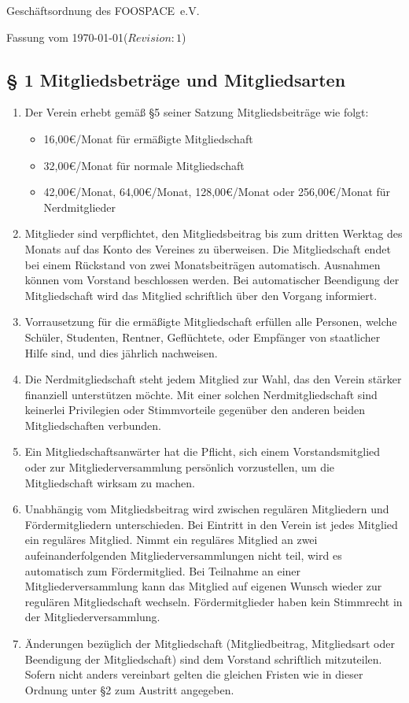 \documentclass[10pt,a4paper]{article}
\newcommand{\name}{FOOSPACE}
\newcommand{\revision}{$Revision: 1$}
\begin{document}
{\LARGE Geschäftsordnung des \name\ e.V.}

Fassung vom \today (\revision)
%
%
\subsection*{§ 1 Mitgliedsbeträge und Mitgliedsarten}
\begin{enumerate}
\item Der Verein erhebt gemäß §5 seiner Satzung Mitgliedsbeiträge wie folgt:
    \begin{itemize}
    \item 16,00€/Monat für ermäßigte Mitgliedschaft
    \item 32,00€/Monat für normale Mitgliedschaft
    \item 42,00€/Monat, 64,00€/Monat, 128,00€/Monat oder 256,00€/Monat für Nerdmitglieder
    \end{itemize}
    

    \item Mitglieder sind verpflichtet, den Mitgliedsbeitrag bis zum dritten Werktag des Monats
    auf das Konto des Vereines zu überweisen. Die Mitgliedschaft endet bei einem Rückstand
    von zwei Monatsbeiträgen automatisch. Ausnahmen können vom Vorstand beschlossen werden.
    Bei automatischer Beendigung der Mitgliedschaft wird das Mitglied schriftlich über den
    Vorgang informiert.

    \item Vorrausetzung für die ermäßigte Mitgliedschaft erfüllen alle Personen, welche Schüler, Studenten,
    Rentner, Geflüchtete, oder Empfänger von staatlicher Hilfe sind, und dies jährlich nachweisen.

\item Die Nerdmitgliedschaft steht jedem Mitglied zur Wahl, das den Verein stärker
    finanziell unterstützen möchte. Mit einer solchen
    Nerdmitgliedschaft sind keinerlei Privilegien oder Stimmvorteile gegenüber
    den anderen beiden Mitgliedschaften verbunden.
    
    \item Ein Mitgliedschaftsanwärter hat die Pflicht, sich einem Vorstandsmitglied oder zur 
    Mitgliederversammlung persönlich vorzustellen, um die Mitgliedschaft wirksam zu machen.
    \item Unabhängig vom Mitgliedsbeitrag wird zwischen regulären Mitgliedern und Fördermitgliedern
    unterschieden. Bei Eintritt in den Verein ist jedes Mitglied ein reguläres Mitglied.
    Nimmt ein reguläres Mitglied an zwei aufeinanderfolgenden Mitgliederversammlungen nicht
    teil, wird es automatisch zum Fördermitglied. Bei Teilnahme an einer Mitgliederversammlung
    kann das Mitglied auf eigenen Wunsch wieder zur regulären Mitgliedschaft wechseln.
    Fördermitglieder haben kein Stimmrecht in der Mitgliederversammlung.

    
\item Änderungen bezüglich der Mitgliedschaft (Mitgliedbeitrag, Mitgliedsart oder Beendigung der Mitgliedschaft)
    sind dem Vorstand schriftlich mitzuteilen. Sofern nicht anders
    vereinbart gelten die gleichen Fristen wie in dieser Ordnung unter §2
    zum Austritt angegeben.
\end{enumerate}
\end{document}
